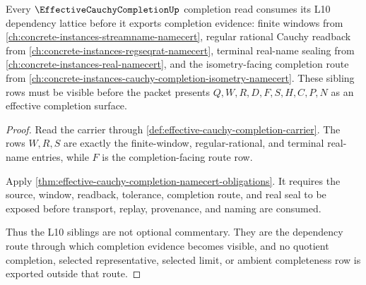 \begin{theorem}\label{thm:effective-cauchy-completion-l10-dependency-route}
Every $\EffectiveCauchyCompletionUp$ completion read consumes its L10 dependency lattice before it exports completion evidence: finite windows from \autoref{ch:concrete-instances-streamname-namecert}, regular rational Cauchy readback from \autoref{ch:concrete-instances-regseqrat-namecert}, terminal real-name sealing from \autoref{ch:concrete-instances-real-namecert}, and the isometry-facing completion route from \autoref{ch:concrete-instances-cauchy-completion-isometry-namecert}. These sibling rows must be visible before the packet presents $Q,W,R,D,F,S,H,C,P,N$ as an effective completion surface.
\end{theorem}
\begin{proof}
Read the carrier through \autoref{def:effective-cauchy-completion-carrier}. The rows $W,R,S$ are exactly the finite-window, regular-rational, and terminal real-name entries, while $F$ is the completion-facing route row.

Apply \autoref{thm:effective-cauchy-completion-namecert-obligations}. It requires the source, window, readback, tolerance, completion route, and real seal to be exposed before transport, replay, provenance, and naming are consumed.

Thus the L10 siblings are not optional commentary. They are the dependency route through which completion evidence becomes visible, and no quotient completion, selected representative, selected limit, or ambient completeness row is exported outside that route.
\end{proof}
